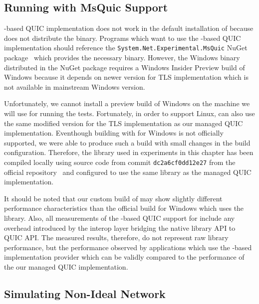 \subsection{Running with MsQuic Support}


\libmsquic{}-based QUIC implementation does not work in the default installation of \dotnet{}
because \dotnet{} does not distribute the \libmsquic{} binary. Programs which want to use the
\libmsquic{}-based QUIC implementation should reference the \texttt{System.Net.Experimental.MsQuic}
NuGet package~\cite{SystemNetQuicExperimentalMsquic} which provides the necessary \libmsquic{}
binary. However, the Windows \libmsquic{} binary distributed in the NuGet package requires a Windows
Insider Preview build of Windows because it depends on newer \libschannel{} version for TLS
implementation which is not available in mainstream Windows version.

Unfortunately, we cannot install a preview build of Windows on the machine we will use for running
the tests. Fortunately, in order to support Linux, \libmsquic{} can also use the same modified
\libopenssl{} version for the TLS implementation as our managed QUIC implementation. Eventhough
building \libmsquic{} with \libopenssl{} for Windows is not officially supported, we were able to
produce such a build with small changes in the \libmsquic{} build configuration. Therefore, the
\libmsquic{} library used in experiments in this chapter has been compiled locally using source code
from commit \texttt{dc2a6cf0dd12e27} from the official \libmsquic{} repository~\cite{msquicGithub}
and configured to use the same \libopenssl{} library as the managed QUIC implementation.

It should be noted that our custom build of \libmsquic{} may show slightly different performance
characteristics than the official build for Windows which uses the \libschannel{} library. Also, all
measurements of the \libmsquic{}-based QUIC support for \dotnet{} include any overhead introduced by
the interop layer bridging the native library API to \dotnet{} QUIC API\@. The measured results,
therefore, do not represent raw \libmsquic{} library performance, but the performance observed by
\dotnet{} applications which use the \libmsquic{}-based implementation provider which can be validly
compared to the performance of the our managed QUIC implementation.

\subsection{Simulating Non-Ideal Network}

